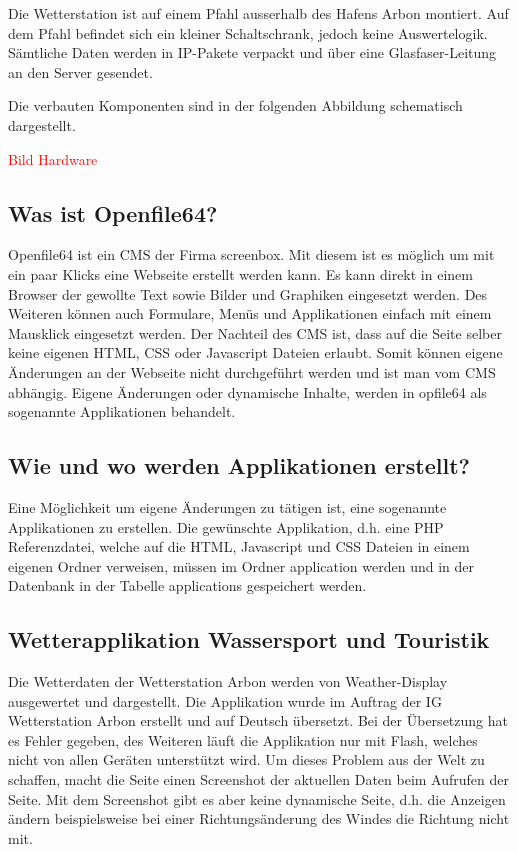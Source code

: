 \documentclass[a4paper,ngerman, 12pt]{report}
\newcommand\Diskussionspunkt[1]{\textcolor{red}{#1}}
\begin{document}
Die Wetterstation ist auf einem Pfahl ausserhalb des Hafens Arbon montiert. Auf dem Pfahl befindet sich ein kleiner Schaltschrank, jedoch keine Auswertelogik. Sämtliche Daten werden in IP-Pakete verpackt und über eine Glasfaser-Leitung an den Server gesendet.

Die verbauten Komponenten sind in der folgenden Abbildung schematisch dargestellt.

\Diskussionspunkt{Bild Hardware}

  
\subsection{Was ist Openfile64?}
Openfile64 ist ein CMS der Firma screenbox. Mit diesem ist es möglich um mit ein paar Klicks eine Webseite erstellt werden kann. Es kann direkt in einem Browser der gewollte Text sowie Bilder und Graphiken eingesetzt werden. Des Weiteren können auch Formulare, Menüs und Applikationen einfach mit einem Mausklick eingesetzt werden. Der Nachteil des CMS ist, dass auf die Seite selber keine eigenen HTML, CSS oder Javascript Dateien erlaubt. Somit können eigene Änderungen an der Webseite nicht durchgeführt werden und ist man vom CMS abhängig. Eigene Änderungen oder dynamische Inhalte, werden in opfile64 als sogenannte Applikationen behandelt.

\subsection{Wie und wo werden Applikationen erstellt?}
Eine Möglichkeit um eigene Änderungen zu tätigen ist, eine sogenannte Applikationen zu erstellen. Die gewünschte Applikation, d.h. eine PHP Referenzdatei, welche auf die HTML, Javascript und CSS Dateien in einem eigenen Ordner verweisen, müssen im Ordner application werden und in der Datenbank in der Tabelle applications gespeichert werden.

\subsection{Wetterapplikation Wassersport und Touristik}
Die Wetterdaten der Wetterstation Arbon werden von Weather-Display ausgewertet und dargestellt. Die Applikation wurde im Auftrag der IG Wetterstation Arbon erstellt und auf Deutsch übersetzt. Bei der Übersetzung hat es Fehler gegeben, des Weiteren läuft die Applikation nur mit Flash, welches nicht von allen Geräten unterstützt wird. Um dieses Problem aus der Welt zu schaffen, macht die Seite einen Screenshot der aktuellen Daten beim Aufrufen der Seite. Mit dem Screenshot gibt es aber keine dynamische Seite, d.h. die Anzeigen ändern beispielsweise bei einer Richtungsänderung des Windes die Richtung nicht mit. 
\end{document}
